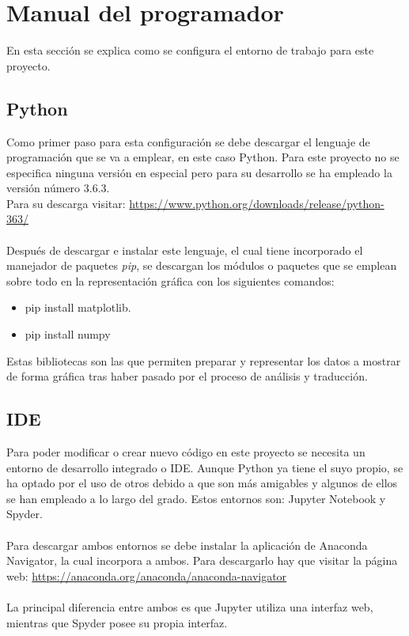 \section{Manual del programador}
En esta sección se explica como se configura el entorno de trabajo para este proyecto.
\subsection{Python}
Como primer paso para esta configuración se debe descargar el lenguaje de programación que se va a emplear, en este caso Python. Para este proyecto no se especifica ninguna versión en especial pero para su desarrollo se ha empleado la versión número 3.6.3.\\
Para  su descarga visitar: \url{https://www.python.org/downloads/release/python-363/}\\
\\
Después de descargar e instalar este lenguaje, el cual tiene incorporado el manejador de paquetes \textit{pip}, se descargan los módulos o paquetes que se emplean sobre todo en la representación gráfica con los siguientes comandos:
\begin{itemize}
	\item pip install matplotlib.
	\item pip install numpy
\end{itemize}
Estas bibliotecas son las que permiten preparar y representar los datos a mostrar de forma gráfica tras haber pasado por el proceso de análisis y traducción.\\

\subsection{IDE}
Para poder modificar o crear nuevo código en este proyecto se necesita un entorno de desarrollo integrado o IDE. Aunque Python ya tiene el suyo propio, se ha optado por el uso de otros debido a que son más amigables y algunos de ellos se han empleado a lo largo del grado. Estos entornos son: Jupyter Notebook y Spyder.\\
\\
Para descargar ambos entornos se debe instalar la aplicación de Anaconda Navigator, la cual incorpora a ambos. Para descargarlo hay que visitar la página web: \url{https://anaconda.org/anaconda/anaconda-navigator} \\
\\
La principal diferencia entre ambos es que Jupyter utiliza una interfaz web, mientras que Spyder posee su propia interfaz.\\

